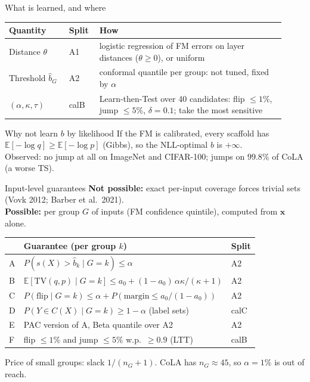 \documentclass[aspectratio=169,11pt]{beamer}
\providecommand{\x}{}\renewcommand{\x}{\bm{x}}
\newcommand{\E}{\mathbb{E}}
\newcommand{\source}[1]{\par\vfill{\scriptsize\color{inkgrey}#1}}
\begin{document}
\begin{frame}{What is learned, and where}
  \small
  \begin{tabular}{@{}p{0.2\linewidth}p{0.1\linewidth}p{0.62\linewidth}@{}}
    \toprule
    Quantity & Split & How\\
    \midrule
    Distance $\theta$ & A1 & logistic regression of FM errors on layer distances ($\theta\ge0$), or uniform\\
    Threshold $\hat b_G$ & A2 & conformal quantile per group: not tuned, fixed by $\alpha$\\
    $(\alpha,\kappa,\tau)$ & calB & Learn-then-Test over 40 candidates: flip $\le1\%$, jump $\le5\%$, $\delta=0.1$; take the most sensitive\\
    \bottomrule
  \end{tabular}
  \par\bigskip
  \begin{block}{Why not learn $b$ by likelihood}
    If the FM is calibrated, every scaffold has $\E[-\log q]\ge\E[-\log p]$ (Gibbs), so the NLL-optimal $b$ is $+\infty$.\\
    Observed: no jump at all on ImageNet and CIFAR-100; jumps on $99.8\%$ of CoLA (a worse TS).
  \end{block}
\end{frame}

\begin{frame}{Input-level guarantees}
  \small
  \textbf{Not possible:} exact per-input coverage forces trivial sets (Vovk 2012; Barber et al.\ 2021).\\
  \textbf{Possible:} per group $G$ of inputs (FM confidence quintile), computed from $\x$ alone.
  \par\medskip
  \begin{tabular}{@{}lll@{}}
    \toprule
    & Guarantee (per group $k$) & Split\\
    \midrule
    A & $P(s(X)>\hat b_k\mid G=k)\le\alpha$ & A2\\
    B & $\E[\mathrm{TV}(q,p)\mid G=k]\le a_0+(1-a_0)\,\alpha\kappa/(\kappa+1)$ & A2\\
    C & $P(\text{flip}\mid G=k)\le\alpha+P(\text{margin}\le a_0/(1-a_0))$ & A2\\
    D & $P(Y\in C(X)\mid G=k)\ge1-\alpha$ (label sets) & calC\\
    E & PAC version of A, Beta quantile over A2 & A2\\
    F & flip $\le1\%$ and jump $\le5\%$ w.p.\ $\ge0.9$ (LTT) & calB\\
    \bottomrule
  \end{tabular}
  \source{Price of small groups: slack $1/(n_G+1)$. CoLA has $n_G\approx45$, so $\alpha=1\%$ is out of reach.}
\end{frame}
\end{document}

